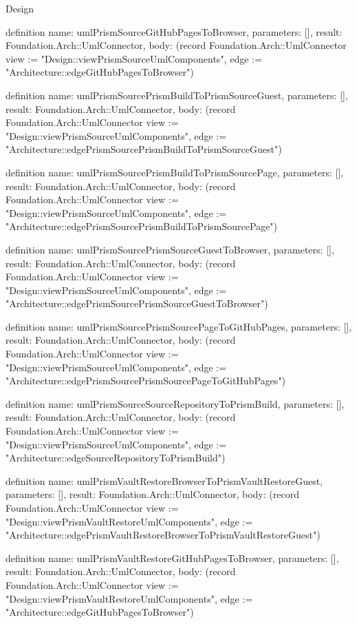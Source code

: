 \begin{lexlean}{Design}
\begin{semanticmodule}
definition{
  name: umlPrismSourceGitHubPagesToBrowser,
  parameters: [],
  result: Foundation.Arch::UmlConnector,
  body: (record Foundation.Arch::UmlConnector {view := "Design::viewPrismSourceUmlComponents", edge := "Architecture::edgeGitHubPagesToBrowser"})
}

definition{
  name: umlPrismSourcePrismBuildToPrismSourceGuest,
  parameters: [],
  result: Foundation.Arch::UmlConnector,
  body: (record Foundation.Arch::UmlConnector {view := "Design::viewPrismSourceUmlComponents", edge := "Architecture::edgePrismSourcePrismBuildToPrismSourceGuest"})
}

definition{
  name: umlPrismSourcePrismBuildToPrismSourcePage,
  parameters: [],
  result: Foundation.Arch::UmlConnector,
  body: (record Foundation.Arch::UmlConnector {view := "Design::viewPrismSourceUmlComponents", edge := "Architecture::edgePrismSourcePrismBuildToPrismSourcePage"})
}

definition{
  name: umlPrismSourcePrismSourceGuestToBrowser,
  parameters: [],
  result: Foundation.Arch::UmlConnector,
  body: (record Foundation.Arch::UmlConnector {view := "Design::viewPrismSourceUmlComponents", edge := "Architecture::edgePrismSourcePrismSourceGuestToBrowser"})
}

definition{
  name: umlPrismSourcePrismSourcePageToGitHubPages,
  parameters: [],
  result: Foundation.Arch::UmlConnector,
  body: (record Foundation.Arch::UmlConnector {view := "Design::viewPrismSourceUmlComponents", edge := "Architecture::edgePrismSourcePrismSourcePageToGitHubPages"})
}

definition{
  name: umlPrismSourceSourceRepositoryToPrismBuild,
  parameters: [],
  result: Foundation.Arch::UmlConnector,
  body: (record Foundation.Arch::UmlConnector {view := "Design::viewPrismSourceUmlComponents", edge := "Architecture::edgeSourceRepositoryToPrismBuild"})
}

definition{
  name: umlPrismVaultRestoreBrowserToPrismVaultRestoreGuest,
  parameters: [],
  result: Foundation.Arch::UmlConnector,
  body: (record Foundation.Arch::UmlConnector {view := "Design::viewPrismVaultRestoreUmlComponents", edge := "Architecture::edgePrismVaultRestoreBrowserToPrismVaultRestoreGuest"})
}

definition{
  name: umlPrismVaultRestoreGitHubPagesToBrowser,
  parameters: [],
  result: Foundation.Arch::UmlConnector,
  body: (record Foundation.Arch::UmlConnector {view := "Design::viewPrismVaultRestoreUmlComponents", edge := "Architecture::edgeGitHubPagesToBrowser"})
}


\end{semanticmodule}
\end{lexlean}
